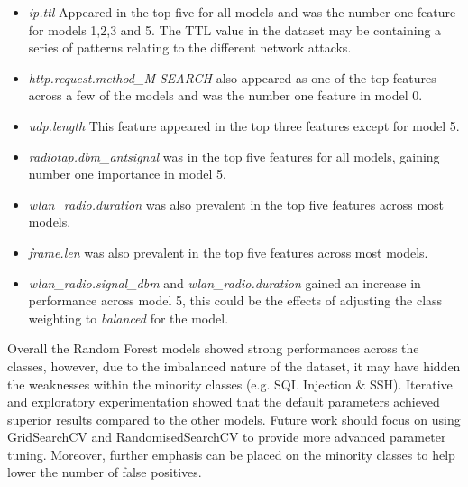 \begin{itemize}
	\item \textit{ip.ttl} Appeared in the top five for all models and was the number one feature for models 1,2,3 and 5. The TTL value in the dataset may be containing a series of patterns relating to the different network attacks.
	\item \textit{http.request.method\_M-SEARCH} also appeared as one of the top features across a few of the models and was the number one feature in model 0. 
	\item \textit{udp.length} This feature appeared in the top three features except for model 5.
  	\item \textit{radiotap.dbm\_antsignal} was in the top five features for all models, gaining number one importance in model 5.
	\item \textit{wlan\_radio.duration} was also prevalent in the top five features across most models.
	\item \textit{frame.len} was also prevalent in the top five features across most models.
	\item \textit{wlan\_radio.signal\_dbm} and \textit{wlan\_radio.duration} gained an increase in performance across model 5, this could be the effects of adjusting the class weighting to \textit{balanced} for the model.
\end{itemize}


\medskip
Overall the Random Forest models showed strong performances across the classes, however, due to the imbalanced nature of the dataset, it may have hidden the weaknesses within the minority classes (e.g. SQL Injection \& SSH). Iterative and exploratory experimentation showed that the default parameters achieved superior results compared to the other models. Future work should focus on using GridSearchCV and RandomisedSearchCV to provide more advanced parameter tuning. Moreover, further emphasis can be placed on the minority classes to help lower the number of false positives.

